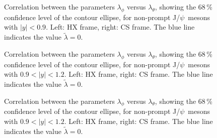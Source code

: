 \documentclass[12pt]{article}
\newcommand{\JPsi}{J/$\psi$}
\begin{document}


\begin{figure}[htb]
\centering
{}
\caption{Correlation between the parameters $\lambda_\phi$ versus
  $\lambda_\theta$, showing the 68\,\% confidence level of the contour
  ellipse, for non-prompt \JPsi\ mesons with $|y| < 0.9$. Left: HX frame, right: CS
  frame. The blue line indicates the value $\tilde{\lambda} = 0$.}
\end{figure}
\clearpage


\begin{figure}[htb]
\centering
{}
\caption{Correlation between the parameters $\lambda_\phi$ versus
  $\lambda_\theta$, showing the 68\,\% confidence level of the contour
  ellipse, for non-prompt \JPsi\ mesons with $0.9 < |y| < 1.2$. Left: HX
  frame, right: CS frame. The blue line indicates the value
  $\tilde{\lambda} = 0$.}
\end{figure}
\clearpage

\begin{figure}[htb]
\centering
{}
\caption{Correlation between the parameters $\lambda_\phi$ versus
  $\lambda_\theta$, showing the 68\,\% confidence level of the contour
  ellipse, for non-prompt \JPsi\ mesons with $0.9 < |y| < 1.2$. Left: HX
  frame, right: CS frame. The blue line indicates the value
  $\tilde{\lambda} = 0$.}
\end{figure}
\clearpage
\end{document}
